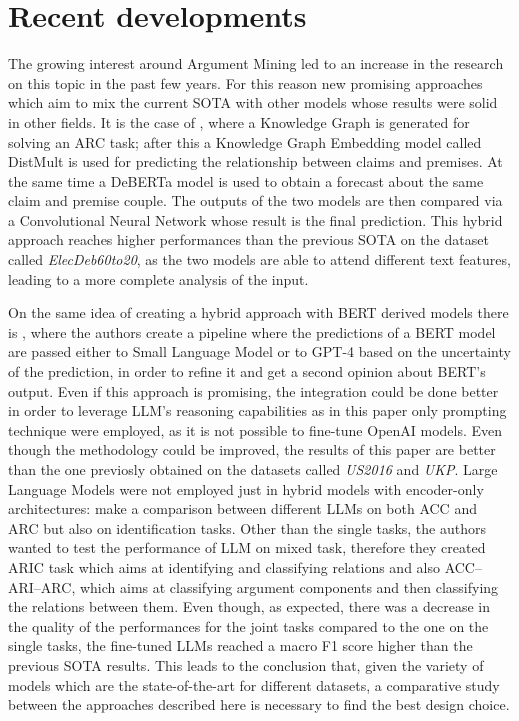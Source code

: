 \section{Recent developments}
The growing interest around Argument Mining led to an increase in the research on this topic in the past few years. For this reason new promising approaches which aim to mix the current SOTA 
with other models whose results were solid in other fields. It is the case of \textcite{dore}, where a Knowledge Graph is generated for solving an ARC task; after this a Knowledge Graph Embedding model called DistMult
is used for predicting the relationship between claims and premises. At the same time a DeBERTa model is used to obtain a forecast about the same claim and premise couple. The outputs of the two models are then 
compared via a Convolutional Neural Network whose result is the final prediction. This hybrid approach reaches higher performances than the previous SOTA on the dataset called \textit{ElecDeb60to20}, as the two models
are able to attend different text features, leading to a more complete analysis of the input.


On the same idea of creating a hybrid approach with BERT derived models there is \textcite{pietron2024efficient}, where the authors create a pipeline where the predictions of a BERT model are passed either
to Small Language Model or to GPT-4 based on the uncertainty of the prediction, in order to refine it and get a second opinion about BERT's output. Even if this approach is promising, the integration
could be done better in order to leverage LLM's reasoning capabilities as in this paper only prompting technique were employed, as it is not possible to fine-tune OpenAI models. Even though the methodology could 
be improved, the results of this paper are better than the one previosly obtained on the datasets called \textit{US2016} and \textit{UKP}. Large Language Models were not employed just in hybrid models with 
encoder-only architectures: \textcite{cabessa2025argument} make a comparison between different LLMs on both ACC and ARC but also on identification tasks. Other than the single tasks, the authors wanted to test the 
performance of LLM on mixed task, therefore they created ARIC task which aims at identifying and classifying relations and also ACC–ARI–ARC, which aims at classifying argument components and then classifying the 
relations between them. Even though, as expected, there was a decrease in the quality of the performances for the joint tasks compared to the one on the single tasks, the fine-tuned LLMs reached a macro F1 score
higher than the previous SOTA results. This leads to the conclusion that, given the variety of models which are the state-of-the-art for different datasets, a comparative study between the approaches described here
is necessary to find the best design choice.